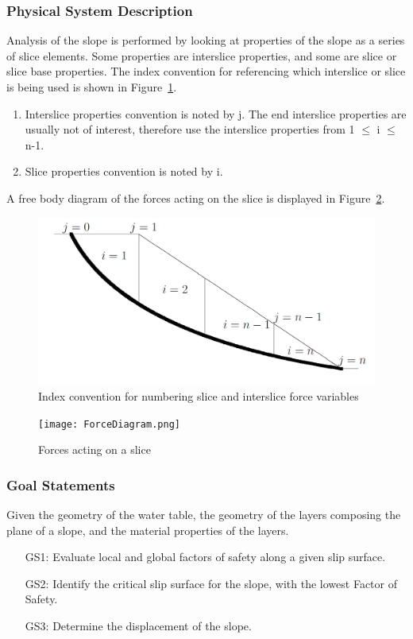 \documentclass[12pt]{article}
\begin{document}
\subsubsection{Physical System Description}
\label{Sec:PSD}
Analysis of the slope is performed by looking at properties of the slope as a series of slice elements. Some properties are interslice properties, and some are slice or slice base properties.  The index convention for referencing which interslice or slice is being used is shown in Figure~\ref{Figure:Icfnsaifv}.
\begin{enumerate}
\item{Interslice properties convention is noted by j. The end interslice properties are usually not of interest, therefore use the interslice properties from 1 $\leq{}$ i $\leq{}$ n-1.}
\item{Slice properties convention is noted by i.}
\end{enumerate}
A free body diagram of the forces acting on the slice is displayed in Figure~\ref{Figure:Faoas}.
\begin{figure}
\begin{center}
\includegraphics{IndexConvention.png}
\caption{Index convention for numbering slice and interslice force variables}
\label{Figure:Icfnsaifv}
\end{center}
\end{figure}
\begin{figure}
\begin{center}
\texttt{[image: ForceDiagram.png]}
\caption{Forces acting on a slice}
\label{Figure:Faoas}
\end{center}
\end{figure}
\subsubsection{Goal Statements}
\label{Sec:GS}
Given the geometry of the water table, the geometry of the layers composing the plane of a slope, and the material properties of the layers.
\begin{itemize}
\item[GS1:]Evaluate local and global factors of safety along a given slip surface.
\item[GS2:]Identify the critical slip surface for the slope, with the lowest Factor of Safety.
\item[GS3:]Determine the displacement of the slope.
\end{itemize}
\end{document}
